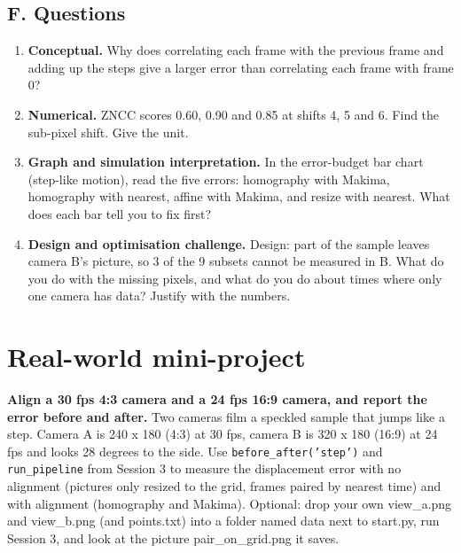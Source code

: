 \documentclass[11pt,a4paper]{article}
\begin{document}
\subsection*{F. Questions}
\begin{enumerate}[nosep]
\item \textbf{Conceptual.} Why does correlating each frame with the previous frame and adding up the steps give a larger error than correlating each frame with frame 0?
\item \textbf{Numerical.} ZNCC scores 0.60, 0.90 and 0.85 at shifts 4, 5 and 6. Find the sub-pixel shift. Give the unit.
\item \textbf{Graph and simulation interpretation.} In the error-budget bar chart (step-like motion), read the five errors: homography with Makima, homography with nearest, affine with Makima, and resize with nearest. What does each bar tell you to fix first?
\item \textbf{Design and optimisation challenge.} Design: part of the sample leaves camera B's picture, so 3 of the 9 subsets cannot be measured in B. What do you do with the missing pixels, and what do you do about times where only one camera has data? Justify with the numbers.
\end{enumerate}

\section{Real-world mini-project}
\textbf{Align a 30 fps 4:3 camera and a 24 fps 16:9 camera, and report the error before and after.} Two cameras film a speckled sample that jumps like a step. Camera A is 240 x 180 (4:3) at 30 fps, camera B is 320 x 180 (16:9) at 24 fps and looks 28 degrees to the side. Use \texttt{before\_after('step')} and \texttt{run\_pipeline} from Session 3 to measure the displacement error with no alignment (pictures only resized to the grid, frames paired by nearest time) and with alignment (homography and Makima). Optional: drop your own view\_a.png and view\_b.png (and points.txt) into a folder named data next to start.py, run Session 3, and look at the picture pair\_on\_grid.png it saves.
\end{document}
